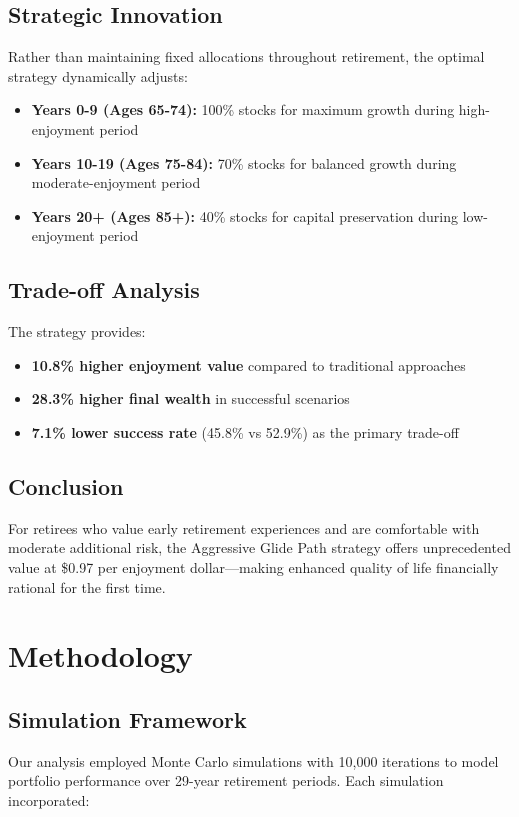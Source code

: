 \documentclass[11pt,letterpaper]{article}
\begin{document}
\subsection{Strategic Innovation}
Rather than maintaining fixed allocations throughout retirement, the optimal strategy dynamically adjusts:
\begin{itemize}[leftmargin=*]
    \item \textbf{Years 0-9 (Ages 65-74):} 100\% stocks for maximum growth during high-enjoyment period
    \item \textbf{Years 10-19 (Ages 75-84):} 70\% stocks for balanced growth during moderate-enjoyment period  
    \item \textbf{Years 20+ (Ages 85+):} 40\% stocks for capital preservation during low-enjoyment period
\end{itemize}

\subsection{Trade-off Analysis}
The strategy provides:
\begin{itemize}[leftmargin=*]
    \item \textbf{10.8\% higher enjoyment value} compared to traditional approaches
    \item \textbf{28.3\% higher final wealth} in successful scenarios
    \item \textbf{7.1\% lower success rate} (45.8\% vs 52.9\%) as the primary trade-off
\end{itemize}

\subsection{Conclusion}
For retirees who value early retirement experiences and are comfortable with moderate additional risk, the Aggressive Glide Path strategy offers unprecedented value at \$0.97 per enjoyment dollar—making enhanced quality of life financially rational for the first time.

\section{Methodology}

\subsection{Simulation Framework}
Our analysis employed Monte Carlo simulations with 10,000 iterations to model portfolio performance over 29-year retirement periods. Each simulation incorporated:
\end{document}
